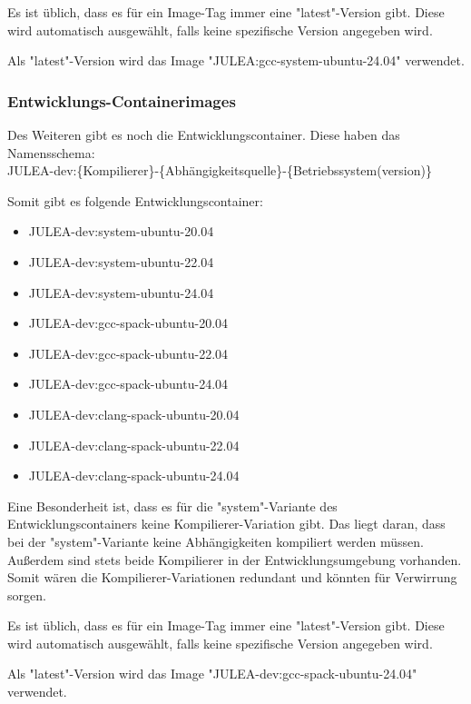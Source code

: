 Es ist üblich, dass es für ein Image-Tag immer eine "latest"-Version gibt. Diese wird automatisch ausgewählt, falls keine spezifische Version angegeben wird.

Als "latest"-Version wird das Image "JULEA:gcc-system-ubuntu-24.04" verwendet. 

\subsubsection{Entwicklungs-Containerimages}

Des Weiteren gibt es noch die Entwicklungscontainer. Diese haben das Namensschema: \\
JULEA-dev:\{Kompilierer\}-\{Abhängigkeitsquelle\}-\{Betriebssystem(version)\}

Somit gibt es folgende Entwicklungscontainer:

\begin{multicols}{2}
    \begin{itemize}
        \item JULEA-dev:system-ubuntu-20.04  
        \item JULEA-dev:system-ubuntu-22.04  
        \item JULEA-dev:system-ubuntu-24.04  
        \item JULEA-dev:gcc-spack-ubuntu-20.04   
        \item JULEA-dev:gcc-spack-ubuntu-22.04   
        \item JULEA-dev:gcc-spack-ubuntu-24.04   
        \item JULEA-dev:clang-spack-ubuntu-20.04 
        \item JULEA-dev:clang-spack-ubuntu-22.04 
        \item JULEA-dev:clang-spack-ubuntu-24.04 
    \end{itemize} 
\end{multicols}

Eine Besonderheit ist, dass es für die "system"-Variante des Entwicklungscontainers keine Kompilierer-Variation gibt. Das liegt daran, dass bei der "system"-Variante keine Abhängigkeiten kompiliert werden müssen. Außerdem sind stets beide Kompilierer in der Entwicklungsumgebung vorhanden. Somit wären die Kompilierer-Variationen redundant und könnten für Verwirrung sorgen. 

Es ist üblich, dass es für ein Image-Tag immer eine "latest"-Version gibt. Diese wird automatisch ausgewählt, falls keine spezifische Version angegeben wird.

Als "latest"-Version wird das Image "JULEA-dev:gcc-spack-ubuntu-24.04" verwendet. 

